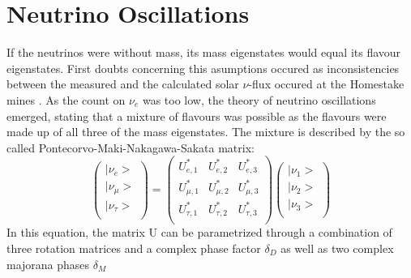     
    \section{Neutrino Oscillations}
    \label{ch:Introduction:sec:neutrino Oscillations}
      If the neutrinos were without mass, its mass eigenstates would equal its flavour eigenstates.
    First doubts concerning this asumptions occured as inconsistencies between the measured and the calculated solar $\nu$-flux occured at the Homestake mines \cite{}. As the count on $\nu_e$ was too low, the theory of neutrino oscillations emerged, stating that a mixture of flavours was possible as the flavours were made up of all three of the mass eigenstates. The mixture is described by the so called Pontecorvo-Maki-Nakagawa-Sakata matrix:
        \begin{equation}
        \left(
        \begin{array}{c}
	  |\nu_e>\\
	  |\nu_\mu>\\
	  |\nu_\tau>\\
        \end{array}
        \right)
	 = \left(
	\begin{array}{ccc}
      	U^*_{e,1} & U^*_{e,2} & U^*_{e,3}\\
      	U^*_{\mu,1} & U^*_{\mu,2} & U^*_{\mu,3}\\
      	U^*_{\tau,1} & U^*_{\tau,2} & U^*_{\tau,3}\\
      	\end{array}
	\right)
	\left(
	\begin{array}{c}
      	|\nu_1>\\
      	|\nu_2>\\
      	|\nu_3>\\
    	 \end{array}
    	 \right)
    \end{equation}
    In this equation, the matrix U can be parametrized through a combination of three rotation matrices and a complex phase factor $\delta_D$ as well as two complex majorana phases $\delta_M$
    
